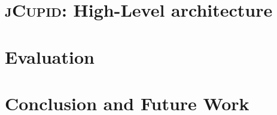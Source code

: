 \documentclass{llncs}
\begin{document}
\section{\textsc{jCupid}: High-Level architecture}
\label{sec:jcupid}


\section{Evaluation}
\label{sec:evaluation}



\section{Conclusion and Future Work} 
\label{sec:conclusion}






\newpage
\appendix

\end{document}
